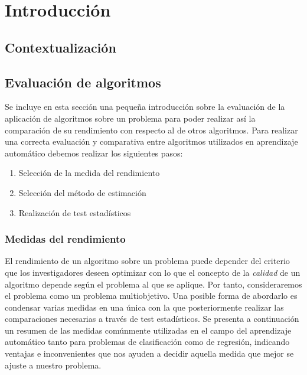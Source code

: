 %
%


\chapter{Introducción}
\setcounter{page}{1}

\section{Contextualización}

\section{Evaluación de algoritmos}

	Se incluye en esta sección una pequeña introducción sobre la evaluación de la aplicación de algoritmos sobre un problema para poder realizar así la comparación de su rendimiento con respecto al de otros algoritmos. Para realizar una correcta evaluación y comparativa entre algoritmos utilizados en aprendizaje automático debemos realizar los siguientes pasos:
	
	\begin{enumerate}
		\item Selección de la medida del rendimiento
		\item Selección del método de estimación
		\item Realización de test estadísticos
	\end{enumerate}

\subsection{Medidas del rendimiento}
	
	El rendimiento de un algoritmo sobre un problema puede depender del criterio que los investigadores deseen optimizar con lo que el concepto de la \textit{calidad} de un algoritmo depende según el problema al que se aplique. Por tanto, consideraremos el problema como un problema multiobjetivo. Una posible forma de abordarlo es condensar varias medidas en una única con la que posteriormente realizar las comparaciones necesarias a través de test estadísticos. Se presenta a continuación un resumen de las medidas comúnmente utilizadas en el campo del aprendizaje automático tanto para problemas de clasificación como de regresión, indicando ventajas e inconvenientes que nos ayuden a decidir aquella medida que mejor se ajuste a nuestro problema.
	
